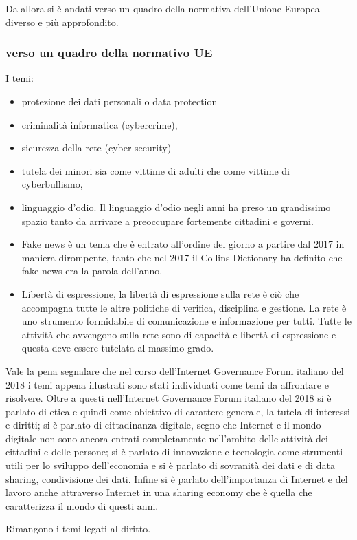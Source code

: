 Da allora si è andati verso un quadro della normativa dell'Unione Europea diverso e più approfondito. 
\subsubsection{verso un quadro della normativo UE }
I temi:

\begin{itemize}
    \item protezione dei dati personali o data protection 
    \item criminalità informatica (cybercrime), 
    \item sicurezza della rete (cyber security) 
    \item tutela dei minori sia come vittime di adulti che come vittime di cyberbullismo, 
    \item linguaggio d'odio. Il linguaggio d'odio negli anni ha preso un grandissimo spazio tanto da arrivare a preoccupare fortemente cittadini e governi. 
    \item Fake news è un tema che è entrato all'ordine del giorno a partire dal 2017 in maniera dirompente, tanto che nel 2017 il Collins Dictionary ha definito che fake news era la parola dell'anno. 
    \item Libertà di espressione, la libertà di espressione sulla rete è ciò che accompagna tutte le altre politiche di verifica, disciplina e gestione. La rete è uno strumento formidabile di comunicazione e informazione per tutti. Tutte le attività che avvengono sulla rete sono di capacità e libertà di espressione e questa deve essere tutelata al massimo grado.
    \end{itemize}
    Vale la pena segnalare che nel corso dell'Internet Governance Forum italiano del 2018 i temi appena illustrati sono stati individuati come temi da affrontare e risolvere. Oltre a questi nell'Internet Governance Forum italiano del 2018 si è parlato di etica e quindi come obiettivo di carattere generale, la tutela di interessi e diritti; si è parlato di cittadinanza digitale, segno che Internet e il mondo digitale non sono ancora entrati completamente nell'ambito delle attività dei cittadini e delle persone; si è parlato di innovazione e tecnologia come strumenti utili per lo sviluppo dell'economia e si è parlato di sovranità dei dati e di data sharing, condivisione dei dati. Infine si è parlato dell'importanza di Internet e del lavoro anche attraverso Internet in una sharing economy che è quella che caratterizza il mondo di questi anni. \par
    Rimangono i temi legati al diritto. 
